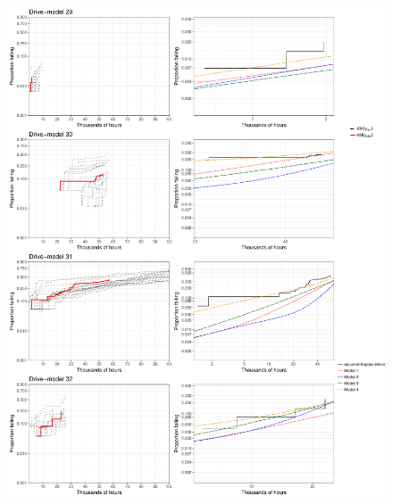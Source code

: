 \documentclass[12pt]{article}
\begin{document}
\begin{figure}[H]
\includegraphics[width=\textwidth]{ppcheck-v3-8.pdf}
\end{figure}
\end{document}
